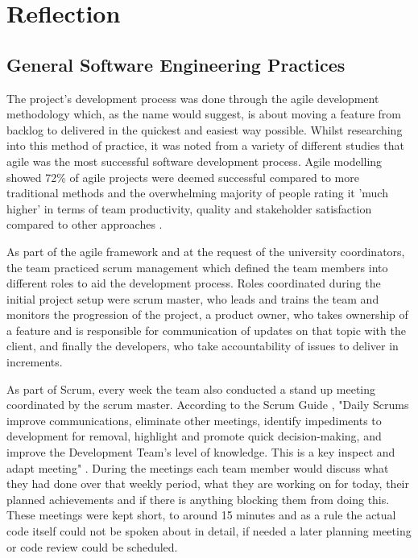 \documentclass{l3proj}
\begin{document}
\section{Reflection}
\label{sec:reflection}

\subsection{General Software Engineering Practices}
The project's development process was done through the agile development methodology which, as the name would suggest, is about moving a feature from backlog to delivered in the quickest and easiest way possible. Whilst researching into this method of practice, it was noted from a variety of different studies that agile was the most successful software development process. Agile modelling showed 72\% of agile projects were deemed successful compared to more traditional methods and the overwhelming majority of people rating it 'much higher' in terms of team productivity, quality and stakeholder satisfaction compared to other approaches \cite{AgileSuccess}.

As part of the agile framework and at the request of the university coordinators, the team practiced scrum management which defined the team members into different roles to aid the development process. Roles coordinated during the initial project setup were scrum master, who leads and trains the team and monitors the progression of the project, a product owner, who takes ownership of a feature and is responsible for communication of updates on that topic with the client, and finally the developers, who take accountability of issues to deliver in increments.  

As part of Scrum, every week the team also conducted a stand up meeting coordinated by the scrum master. According to the Scrum Guide \cite{ScrumGuide}, "Daily Scrums improve communications, eliminate other meetings, identify impediments to development for removal, highlight and promote quick decision-making, and improve the Development Team's level of knowledge. This is a key inspect and adapt meeting" \cite{DailyScrum}. During the meetings each team member would discuss what they had done over that weekly period, what they are working on for today, their planned achievements and if there is anything blocking them from doing this. These meetings were kept short, to around 15 minutes and as a rule the actual code itself could not be spoken about in detail, if needed a later planning meeting or code review could be scheduled.
\end{document}
